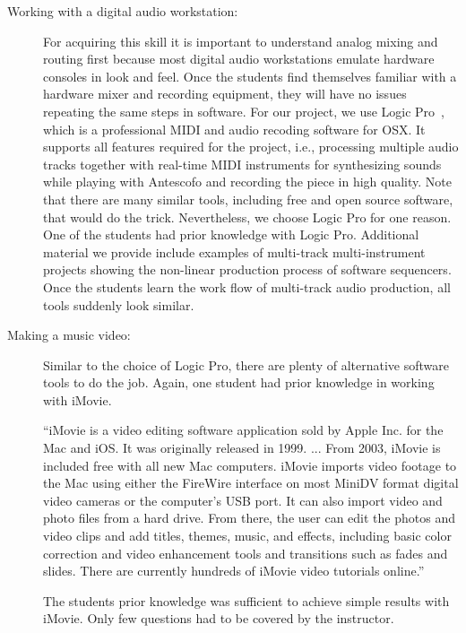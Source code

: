 \documentclass[onecolumn,nocopyrightspace,preprint]{sigplanconf}
\begin{document}
\begin{description}
\item[Working with a digital audio workstation:] For acquiring this skill it
is important to understand analog mixing and routing first because most
digital audio workstations emulate hardware consoles in look and feel. Once
the students find themselves familiar with a hardware mixer and recording
equipment, they will have no issues repeating the same steps in software. For
our project, we use Logic Pro~\cite{website:logic}, which is a professional
MIDI and audio recoding software for OSX. It supports all features required
for the project, i.e., processing multiple audio tracks together with  
real-time MIDI instruments for synthesizing sounds while playing with Antescofo and
recording the piece in high quality.  Note that there are many similar tools,
including free and open source software, that would do the trick.
Nevertheless, we choose Logic Pro for one reason. One of the students had
prior knowledge with Logic Pro. Additional material we provide include
examples of multi-track multi-instrument projects showing the non-linear
production process of software sequencers. Once the students learn the work
flow of multi-track audio production, all tools suddenly look similar.

\item[Making a music video:] Similar to the choice of Logic Pro, there are
plenty of alternative software tools to do the job. Again, one student had
prior knowledge in working with iMovie.

``iMovie is a video editing software application sold by Apple Inc. for the Mac
and iOS. It was originally released in 1999. ... From 2003, iMovie is included
free with all new Mac computers. iMovie imports video footage to the Mac using
either the FireWire interface on most MiniDV format digital video cameras or
the computer's USB port. It can also import video and photo files from a hard
drive. From there, the user can edit the photos and video clips and add
titles, themes, music, and effects, including basic color correction and video
enhancement tools and transitions such as fades and slides. There are
currently hundreds of iMovie video tutorials online.''~\cite{website:imovie}

The students prior knowledge was sufficient to achieve simple results with
iMovie. Only few questions had to be covered by the instructor.

\end{description}
\end{document}
